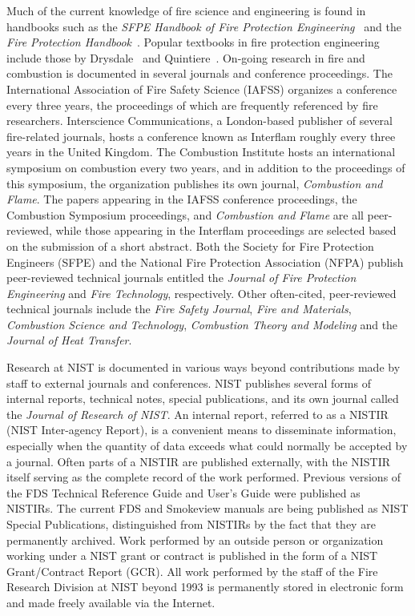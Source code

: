 \documentclass[11pt]{book}
\begin{document}
Much of the current knowledge of fire science and engineering is found in handbooks such as the {\em SFPE Handbook of Fire Protection Engineering}~\cite{SFPE} and the {\em Fire Protection Handbook}~\cite{NFPA}. Popular textbooks in fire protection engineering include those by Drysdale~\cite{Drysdale:1} and Quintiere~\cite{Quintiere:2}. On-going research in fire and combustion is documented in several journals and conference proceedings. The International Association of Fire Safety Science (IAFSS) organizes a conference every three years, the proceedings of which are frequently referenced by fire researchers. Interscience Communications, a London-based publisher of several fire-related journals, hosts a conference known as Interflam roughly every three years in the United Kingdom. The Combustion Institute hosts an international symposium on combustion every two years, and in addition to the proceedings of this symposium, the organization publishes its own journal, {\em Combustion and Flame}. The papers appearing in the IAFSS conference proceedings, the Combustion Symposium proceedings, and {\em Combustion and Flame} are all peer-reviewed, while those appearing in the Interflam proceedings are selected based on the submission of a short abstract. Both the Society for Fire Protection Engineers (SFPE) and the National Fire Protection Association (NFPA) publish peer-reviewed technical journals entitled the {\em Journal of Fire Protection Engineering} and {\em Fire Technology}, respectively. Other often-cited, peer-reviewed technical journals include the {\em Fire Safety Journal}, {\em Fire and Materials}, {\em Combustion Science and Technology}, {\em Combustion Theory and Modeling} and the {\em Journal of Heat Transfer}.

Research at NIST is documented in various ways beyond contributions made by staff to external journals and conferences. NIST publishes several forms of internal reports, technical notes, special publications, and its own journal called the {\em Journal of Research of NIST}. An internal report, referred to as a NISTIR (NIST Inter-agency Report), is a convenient means to disseminate information, especially when the quantity of data exceeds what could normally be accepted by a journal. Often parts of a NISTIR are published externally, with the NISTIR itself serving as the complete record of the work performed. Previous versions of the FDS Technical Reference Guide and User's Guide were published as NISTIRs. The current FDS and Smokeview manuals are being published as NIST Special Publications, distinguished from NISTIRs by the fact that they are permanently archived. Work performed by an outside person or organization working under a NIST grant or contract is published in the form of a NIST Grant/Contract Report (GCR). All work performed by the staff of the Fire Research Division at NIST beyond 1993 is permanently stored in electronic form and made freely available via the Internet.
\end{document}
